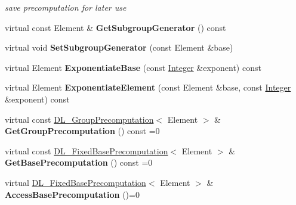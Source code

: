 \begin{DoxyCompactItemize}
\begin{DoxyCompactList}\small\item\em save precomputation for later use \item\end{DoxyCompactList}\item 
\hypertarget{class_d_l___group_parameters_ad4b352edae94ff5b87b44ad72a0f91ae}{
virtual const Element \& {\bfseries GetSubgroupGenerator} () const }
\label{class_d_l___group_parameters_ad4b352edae94ff5b87b44ad72a0f91ae}

\item 
\hypertarget{class_d_l___group_parameters_a1a1a563684f26dc72c212fb3d7b4173d}{
virtual void {\bfseries SetSubgroupGenerator} (const Element \&base)}
\label{class_d_l___group_parameters_a1a1a563684f26dc72c212fb3d7b4173d}

\item 
\hypertarget{class_d_l___group_parameters_aa49341ced39e6ce13f00eae0c2faad87}{
virtual Element {\bfseries ExponentiateBase} (const \hyperlink{class_integer}{Integer} \&exponent) const }
\label{class_d_l___group_parameters_aa49341ced39e6ce13f00eae0c2faad87}

\item 
\hypertarget{class_d_l___group_parameters_a0b49c5d4dbe0b8de7b967d5c6c78e712}{
virtual Element {\bfseries ExponentiateElement} (const Element \&base, const \hyperlink{class_integer}{Integer} \&exponent) const }
\label{class_d_l___group_parameters_a0b49c5d4dbe0b8de7b967d5c6c78e712}

\item 
\hypertarget{class_d_l___group_parameters_a2ec36943206354a6744e68befde4bae9}{
virtual const \hyperlink{class_d_l___group_precomputation}{DL\_\-GroupPrecomputation}$<$ Element $>$ \& {\bfseries GetGroupPrecomputation} () const =0}
\label{class_d_l___group_parameters_a2ec36943206354a6744e68befde4bae9}

\item 
\hypertarget{class_d_l___group_parameters_a3d10dce08641998e06bdd029ffa52a82}{
virtual const \hyperlink{class_d_l___fixed_base_precomputation}{DL\_\-FixedBasePrecomputation}$<$ Element $>$ \& {\bfseries GetBasePrecomputation} () const =0}
\label{class_d_l___group_parameters_a3d10dce08641998e06bdd029ffa52a82}

\item 
\hypertarget{class_d_l___group_parameters_a812c5fc65e7872b5dc004dfb463eafcd}{
virtual \hyperlink{class_d_l___fixed_base_precomputation}{DL\_\-FixedBasePrecomputation}$<$ Element $>$ \& {\bfseries AccessBasePrecomputation} ()=0}
\label{class_d_l___group_parameters_a812c5fc65e7872b5dc004dfb463eafcd}


\end{DoxyCompactItemize}
